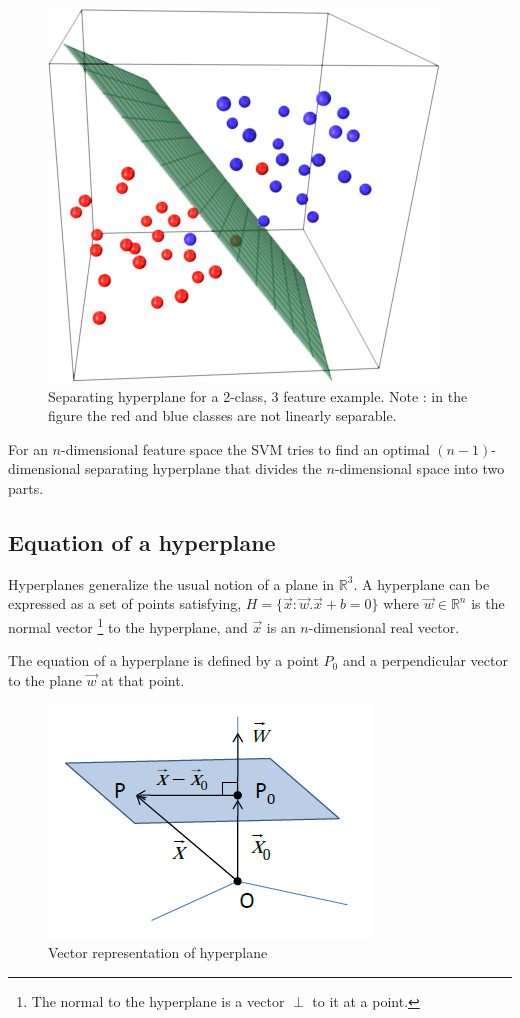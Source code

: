 \documentclass[final,3p,times,twocolumn]{elsarticle}
\begin{document}
\begin{figure}
\includegraphics[scale=0.5]{Images/3D_LinearSVM.png}
\caption{Separating hyperplane for a 2-class, 3 feature example. Note : in the figure the red and blue classes are not linearly separable.}
\end{figure}

For an $n$-dimensional feature space the SVM tries to find an optimal $(n-1)$-dimensional separating hyperplane that divides the $n$-dimensional space into two parts. 

\subsection{Equation of a hyperplane}

Hyperplanes generalize the usual notion of a plane in $\mathbb{R}^3.$
A hyperplane can be expressed as a set of points satisfying, $H =\{\vec{x} : \vec{w}.\vec{x} + b = 0\}$ where $\vec{w} \in \mathbb{R}^n$ is the normal vector \footnote{The normal to the hyperplane is a vector $\perp$ to it at a point.} to the hyperplane, and $\vec{x}$ is an $n$-dimensional real vector. 

The equation of a hyperplane is defined by a point $P_{0}$ and a perpendicular vector to the plane $\vec{w}$ at that point. 

\begin{figure}
\includegraphics[scale=0.7]{Images/hyperplane.png}
\caption{Vector representation of hyperplane}
\end{figure}
\end{document}
